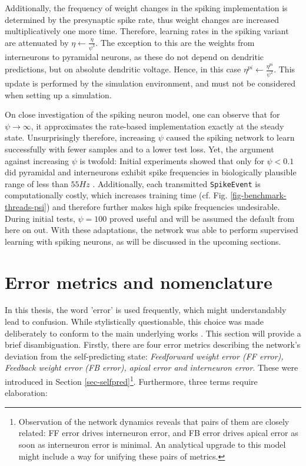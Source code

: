 Additionally, the frequency of weight changes in the spiking implementation is determined by the presynaptic spike rate,
thus weight changes are increased multiplicatively one more time. Therefore, learning rates in the spiking variant are
attenuated by $\eta \leftarrow \frac{\eta}{\psi^3}$. The exception to this are the weights from interneurons to
pyramidal neurons, as these do not depend on dendritic predictions, but on absolute dendritic voltage. Hence, in this
case $\eta^{pi} \leftarrow\frac{\eta^{pi}}{\psi^2}$. This update is performed by the simulation environment, and must
not be considered when setting up a simulation.


On close investigation of the spiking neuron model, one can observe that for $\psi \rightarrow \infty$, it approximates
the rate-based implementation exactly at the steady state. Unsurprisingly therefore, increasing $\psi$ caused the
spiking network to learn successfully with fewer samples and to a lower test loss. Yet, the argument against increasing
$\psi$ is twofold: Initial experiments showed that only for $\psi < 0.1$ did pyramidal and interneurons exhibit spike
frequencies in biologically plausible range of less than $55Hz$ \citep{Kawaguchi2001,Eyal2018}. Additionally, each
transmitted \texttt{SpikeEvent} is computationally costly, which increases training time (cf. Fig.
\ref{fig-benchmark-threads-psi}) and therefore further makes high spike frequencies undesirable. During initial tests,
$\psi = 100$ proved useful and will be assumed the default from here on out. With these adaptations, the network was
able to perform supervised learning with spiking neurons, as will be discussed in the upcoming sections.

\section{Error metrics and nomenclature}

In this thesis, the word 'error' is used frequently, which might understandably lead to confusion. While stylistically
questionable, this choice was made deliberately to conform to the main underlying works
\citep{urbanczik2014learning,sacramento2018dendritic,whittington2019theories,Haider2021}. This section will provide a
brief disambiguation. Firstly, there are four error metrics describing the network's deviation from the self-predicting
state: \textit{Feedforward weight error (FF error), Feedback weight error (FB error), apical error and interneuron
error}. These were introduced in Section \ref{sec-selfpred}\footnote{Observation of the network dynamics reveals that
pairs of them are closely related: FF error drives interneuron error, and FB error drives apical error as soon as
interneuron error is minimal. An analytical upgrade to this model might include a way for unifying these pairs of
metrics.}. Furthermore, three terms require elaboration:\newline

